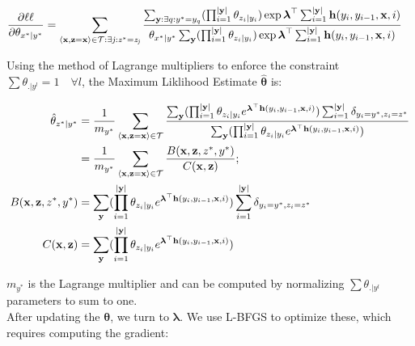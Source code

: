 \documentclass[11pt,onecolumn]{article}
\begin{document}
\begin{align}
\frac{\partial \ell\ell}{\partial \theta_{x^*|y^*}} &= \sum_{\langle\mathbf{x},\mathbf{z}=\mathbf{x}\rangle \in \cal{T} : \exists \mathit{j} : \mathit{z}^* = \mathit{z}_\mathit{j} } \frac{\sum_{\mathbf{y}:\exists q:y^*=y_q} (\prod_{i=1}^{|\mathbf{y}|} \theta_{z_i\mid y_i}) \exp \boldsymbol{\lambda}^\top \sum_{i=1}^{|\mathbf{y}|} \mathbf{h}(y_i, y_{i-1}, \mathbf{x}, i) }{\theta_{x^*|y^*} \sum_{\mathbf{y}} (\prod_{i=1}^{|\mathbf{y}|} \theta_{z_i\mid y_i}) \exp \boldsymbol{\lambda}^\top \sum_{i=1}^{|\mathbf{y}|} \mathbf{h}(y_i, y_{i-1}, \mathbf{x}, i)}
\end{align}

Using the method of Lagrange multipliers to enforce the constraint $\sum \theta_{.|y^l} = 1 \quad \forall l$, the Maximum Liklihood Estimate $\hat{\boldsymbol{\theta}}$ is:

\begin{align}
\hat{\theta}_{z^*|y^*} &= \frac{1}{m_{y^*}} \sum_{\langle\mathbf{x},\mathbf{z}=\mathbf{x}\rangle \in \cal{T}} \frac{\sum_{\mathbf{y}} (\prod_{i=1}^{|\mathbf{y}|} \theta_{z_i\mid y_i} e^{\boldsymbol{\lambda}^\top \mathbf{h}(y_i, y_{i-1}, \mathbf{x}, i)}) \sum_{i=1}^{|\mathbf{y}|}\delta_{y_i=y^*,z_i=z^*} }{\sum_{\mathbf{y}} (\prod_{i=1}^{|\mathbf{y}|} \theta_{z_i\mid y_i} e^{ \boldsymbol{\lambda}^\top \mathbf{h}(y_i, y_{i-1}, \mathbf{x}, i)}) } \\
&= \frac{1}{m_{y^*}} \sum_{\langle\mathbf{x},\mathbf{z}=\mathbf{x}\rangle \in \cal{T}} \frac{B(\mathbf{x}, \mathbf{z}, z^*, y^*)}{C(\mathbf{x}, \mathbf{z})}; \\
B(\mathbf{x}, \mathbf{z}, z^*, y^*) &= \sum_{\mathbf{y}} (\prod_{i=1}^{|\mathbf{y}|} \theta_{z_i\mid y_i} e^{\boldsymbol{\lambda}^\top \mathbf{h}(y_i, y_{i-1}, \mathbf{x}, i)}) \sum_{i=1}^{|\mathbf{y}|}\delta_{y_i=y^*,z_i=z^*}  \\
C(\mathbf{x}, \mathbf{z}) &= \sum_{\mathbf{y}} (\prod_{i=1}^{|\mathbf{y}|} \theta_{z_i\mid y_i} e^{ \boldsymbol{\lambda}^\top \mathbf{h}(y_i, y_{i-1}, \mathbf{x}, i)})
\end{align}

$m_{y^*}$ is the Lagrange multiplier and can be computed by normalizing $\sum \theta_{.|y^l}$ parameters to sum to one.\\

After updating the $\boldsymbol{\theta}$, we turn to $\boldsymbol{\lambda}$. We use L-BFGS to optimize these, which requires computing the gradient:
\end{document}
